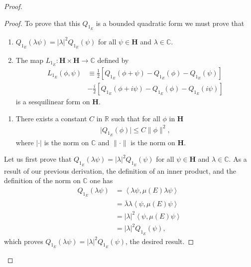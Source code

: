 \begin{proof}
\begin{proof}
To prove that this $Q_{1_E}$ is a bounded quadratic form we must prove that
\begin{enumerate}
    \item $Q_{1_E}(\lambda\psi) = \lvert\lambda\rvert^2 Q_{1_E}(\psi)$ for all $\psi \in \mathbf{H}$ and $\lambda \in \mathbb{C}$.
    \item The map $L_{1_E} : \mathbf{H} \times \mathbf{H} \rightarrow \mathbb{C}$ defined by
    \begin{align}
        L_{1_E}(\phi, \psi) &\equiv \frac{1}{2} \left[ Q_{1_E}(\phi + \psi) - Q_{1_E}(\phi) - Q_{1_E}(\psi) \right] \\
                            &-\frac{i}{2} \left[ Q_{1_E}(\phi + i\psi) - Q_{1_E}(\phi) - Q_{1_E}(i\psi) \right]
    \end{align}
    is a sesquilinear form on $\mathbf{H}$.
\end{enumerate}
\begin{enumerate}
    \item There exists a constant $C$ in $\mathbb{R}$ such that for all $\phi$ in $\mathbf{H}$
    \begin{align}
        \lvert Q_{1_E}(\phi) \rvert \le C \|\phi\|^2,
    \end{align}
    where $\lvert \cdot \rvert$ is the norm on $\mathbb{C}$ and $\|\cdot\|$ is the norm on $\mathbf{H}$.
\end{enumerate}
Let us first prove that $Q_{1_E}(\lambda\psi) = \lvert\lambda\rvert^2 Q_{1_E}(\psi)$ for all $\psi \in \mathbf{H}$ and $\lambda \in \mathbb{C}$. As a result of our previous derivation, the definition of an inner product, and the definition of the norm on $\mathbb{C}$ one has
\begin{align}
    Q_{1_E}(\lambda\psi) &= \left< \lambda\psi, \mu(E) \lambda\psi \right> \\
                         &= \overline{\lambda}\lambda \left< \psi, \mu(E) \psi \right> \\
                         &= \lvert\lambda\rvert^2 \left< \psi, \mu(E) \psi \right> \\
                         &= \lvert\lambda\rvert^2 Q_{1_E}(\psi),
\end{align}
which proves $Q_{1_E}(\lambda\psi) = \lvert\lambda\rvert^2 Q_{1_E}(\psi)$, the desired result.


\end{proof}
\end{proof}
